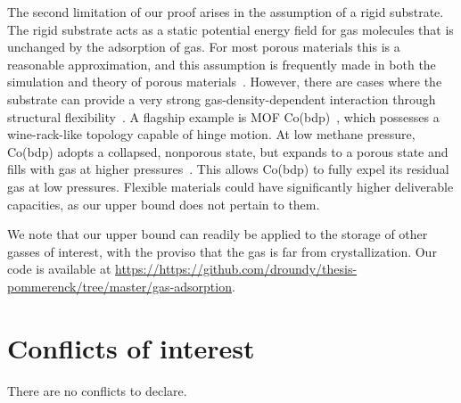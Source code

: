 \documentclass[twoside,twocolumn,9pt]{article}
\renewcommand{\refname}{Notes and references}
\begin{document}
The second limitation of our proof arises in the assumption of a rigid
substrate. The rigid substrate acts as a static potential energy field for gas
molecules that is unchanged by the adsorption of gas. For most porous materials
this is a reasonable approximation, and this assumption is frequently made in
both the simulation and theory of porous materials~\cite{duren2009using}.
However, there are cases where the substrate can provide a very strong
gas-density-dependent interaction through structural
flexibility~\cite{schneemann2014flexible}. A flagship example is MOF
Co(bdp)~\cite{choi2008broadly}, which possesses a wine-rack-like topology
capable of hinge motion. At low methane pressure, Co(bdp) adopts a collapsed,
nonporous state, but expands to a porous state and fills with gas at higher
pressures~\cite{mason2015methane}. This allows Co(bdp) to fully expel its
residual gas at low pressures. Flexible materials could have significantly 
higher deliverable capacities, as our upper bound does not pertain to them.

We note that our upper bound can readily be applied to the storage of other
gasses of interest, with the proviso that the gas is far from crystallization.
Our code is available at \href{https://https://github.com/droundy/thesis-pommerenck/tree/master/gas-adsorption}{https://https://github.com/droundy/thesis-pommerenck/tree/master/gas-adsorption}.

\section*{Conflicts of interest}
There are no conflicts to declare.




\balance


\end{document}
